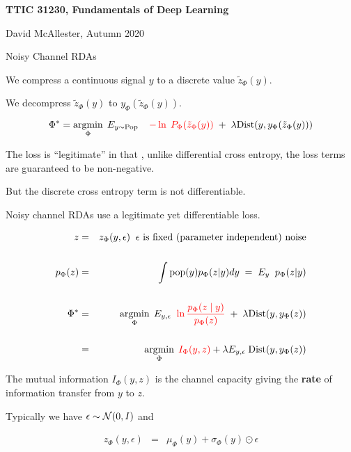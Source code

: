 





{\Huge

  \centerline{\bf TTIC 31230, Fundamentals of Deep Learning}
  \bigskip
  \centerline{David McAllester, Autumn 2020}
  \vfill
  \centerline{Noisy Channel RDAs}
  \vfill
  \vfill



We compress a continuous signal $y$ to a discrete value $\tilde{z}_\Phi(y)$.

\vfill
We decompress $\tilde{z}_\Phi(y)$ to $y_\Phi(\tilde{z}_\Phi(y))$.

\vfill
$$\Phi^* = \operatorname*{argmin}_\Phi\; E_{y \sim \mathrm{Pop}}\;\;\;\;{\color{red} -\ln\;P_\Phi(\tilde{z}_\Phi(y))}\; +\; \lambda \mathrm{Dist}(y,y_\Phi(\tilde{z}_\Phi(y)))$$

\vfill
The loss is ``legitimate'' in that , unlike differential cross entropy, the loss terms are guaranteed to be non-negative.

\vfill
But the discrete cross entropy term is not differentiable.

\vfill
{\color{red} Noisy channel RDAs use a legitimate yet differentiable loss.}


\begin{eqnarray*}
z & = & z_\Phi(y,\epsilon) \;\;\mbox{$\epsilon$ is fixed (parameter independent) noise} \\
\\
p_{\Phi}(z) & = & \int \mathrm{pop}(y)p_\Phi(z|y)dy \;=\;  E_{y}\;\;p_\Phi(z|y) \\
\\
\Phi^* & = & \operatorname*{argmin}_\Phi\; E_{y,\epsilon} \;\; {\color{red} \ln \frac{p_\Phi(z\; |\; y)}{p_\Phi(z)}}\; +\;\lambda\mathrm{Dist}(y,y_\Phi(z)) \\
\\
 & = & \operatorname*{argmin}_\Phi \;{\color{red} I_\Phi(y,z)} + \lambda E_{y,\epsilon}\; \mathrm{Dist}(y,y_\Phi(z))
\end{eqnarray*}

\vfill
The mutual information {\color{red} $I_\Phi(y,z)$} is the channel capacity giving the {\bf rate} of information transfer from $y$ to $z$.


Typically we have $\epsilon \sim {\cal N}(0,I)$ and

\vfill
\begin{eqnarray*}
z_\Phi(y,\epsilon) & = & \mu_\Phi(y) +\sigma_\Phi(y)\odot \epsilon
\end{eqnarray*}

}
